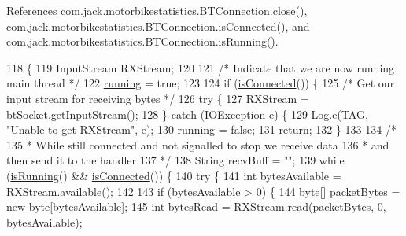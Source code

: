 References com.\+jack.\+motorbikestatistics.\+B\+T\+Connection.\+close(), com.\+jack.\+motorbikestatistics.\+B\+T\+Connection.\+is\+Connected(), and com.\+jack.\+motorbikestatistics.\+B\+T\+Connection.\+is\+Running().


\begin{DoxyCode}
118                       \{
119         InputStream RXStream;
120 
121         \textcolor{comment}{/* Indicate that we are now running main thread */}
122         \hyperlink{classcom_1_1jack_1_1motorbikestatistics_1_1_b_t_connection_a6193b7b92b7f2905a3a43d63db40aba8}{running} = \textcolor{keyword}{true};
123 
124         \textcolor{keywordflow}{if} (\hyperlink{classcom_1_1jack_1_1motorbikestatistics_1_1_b_t_connection_a22f33e46d9f460d78865d4c63b645357}{isConnected}()) \{
125             \textcolor{comment}{/* Get our input stream for receiving bytes */}
126             \textcolor{keywordflow}{try} \{
127                 RXStream = \hyperlink{classcom_1_1jack_1_1motorbikestatistics_1_1_b_t_connection_a0d47f94a35f7c8a07429975446e7b33b}{btSocket}.getInputStream();
128             \} \textcolor{keywordflow}{catch} (IOException e) \{
129                 Log.e(\hyperlink{classcom_1_1jack_1_1motorbikestatistics_1_1_b_t_connection_af9455991fec4de29ffc875eae117a761}{TAG}, \textcolor{stringliteral}{"Unable to get RXStream"}, e);
130                 \hyperlink{classcom_1_1jack_1_1motorbikestatistics_1_1_b_t_connection_a6193b7b92b7f2905a3a43d63db40aba8}{running} = \textcolor{keyword}{false};
131                 \textcolor{keywordflow}{return};
132             \}
133 
134             \textcolor{comment}{/*}
135 \textcolor{comment}{             * While still connected and not signalled to stop we receive data}
136 \textcolor{comment}{             * and then send it to the handler}
137 \textcolor{comment}{             */}
138             String recvBuff = \textcolor{stringliteral}{""};
139             \textcolor{keywordflow}{while} (\hyperlink{classcom_1_1jack_1_1motorbikestatistics_1_1_b_t_connection_a17b07494b0e7cba2e550054d7b47e309}{isRunning}() && \hyperlink{classcom_1_1jack_1_1motorbikestatistics_1_1_b_t_connection_a22f33e46d9f460d78865d4c63b645357}{isConnected}()) \{
140                 \textcolor{keywordflow}{try} \{
141                     \textcolor{keywordtype}{int} bytesAvailable = RXStream.available();
142 
143                     \textcolor{keywordflow}{if} (bytesAvailable > 0) \{
144                         byte[] packetBytes = \textcolor{keyword}{new} byte[bytesAvailable];
145                         \textcolor{keywordtype}{int} bytesRead = RXStream.read(packetBytes, 0, bytesAvailable);

\end{DoxyCode}
